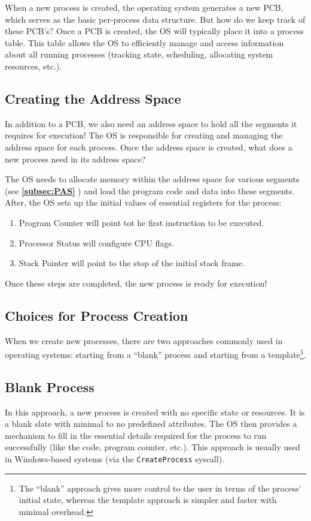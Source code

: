 \documentclass{report}
\newcommand{\refto}[2]{\textbf{\ref{#1:#2} \nameref{#1:#2}}}
\begin{document}
When a new process is created, the operating system generates a new PCB, which serves as the basic
per-process data structure. But how do we keep track of these PCB's? Once a PCB is created, the OS
will typically place it into a process table. This table allows the OS to efficiently manage and
access information about all running processes (tracking state, scheduling, allocating system
resources, etc.). 


\subsection{Creating the Address Space}
In addition to a PCB, we also need an address space to hold all the segments it requires for
execution! The OS is responsible for creating and managing the address space for each process. Once
the address space is created, what does a new process need in its address space?

The OS needs to allocate memory within the address space for various segments (see \refto{subsec}{PAS})
and load the program code and data into these segments. After, the OS sets up the initial values of
essential registers for the process:
\begin{enumerate}[label=\textit{(\roman*)}]
\item Program Counter will point tot he first instruction to be executed.
\item Processor Status will configure CPU flags.
\item Stack Pointer will point to the stop of the initial stack frame.
\end{enumerate}
Once these steps are completed, the new process is ready for execution!


\subsection{Choices for Process Creation}
When we create new processes, there are two approaches commonly used in operating systems: starting
from a ``blank'' process and starting from a template\footnote{The ``blank'' approach gives more
  control to the user in terms of the process' initial state, whereas the template approach is
  simpler and faster with minimal overhead.}.


\subsection*{Blank Process}
In this approach, a new process is created with no specific state or resources. It is a blank slate
with minimal to no  predefined attributes. The OS then provides a mechanism to fill in the
essential details required for the process to run successfully (like the code, program counter,
etc.). This approach is usually used in Windows-based systems (via the \texttt{CreateProcess} syscall).
\end{document}
